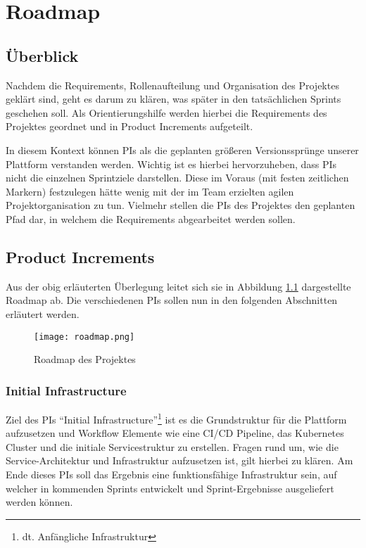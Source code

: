 
\chapter{Roadmap}

\section{Überblick}
Nachdem die Requirements, Rollenaufteilung und Organisation des Projektes geklärt sind, geht es darum zu klären, was später in den tatsächlichen Sprints geschehen soll.
Als Orientierungshilfe werden hierbei die Requirements des Projektes geordnet und in Product Increments aufgeteilt.

In diesem Kontext können \ac{PI}s als die geplanten größeren Versionssprünge unserer Plattform verstanden werden.
Wichtig ist es hierbei hervorzuheben, dass \ac{PI}s nicht die einzelnen Sprintziele darstellen.
Diese im Voraus (mit festen zeitlichen Markern) festzulegen hätte wenig mit der im Team erzielten agilen Projektorganisation zu tun.
Vielmehr stellen die \ac{PI}s des Projektes den geplanten Pfad dar, in welchem die Requirements abgearbeitet werden sollen.

\section{Product Increments}
Aus der obig erläuterten Überlegung leitet sich sie in Abbildung \ref{fig:roadmap} dargestellte Roadmap ab.
Die verschiedenen \ac{PI}s sollen nun in den folgenden Abschnitten erläutert werden.

\begin{figure}
    \centering
    \texttt{[image: roadmap.png]}
    \caption{Roadmap des Projektes}
    \label{fig:roadmap}
\end{figure}

\subsection{Initial Infrastructure}
Ziel des \ac{PI}s ``Initial Infrastructure''\footnote{dt. Anfängliche Infrastruktur} ist es die Grundstruktur für die Plattform aufzusetzen und Workflow Elemente wie eine \ac{CI/CD} Pipeline, das Kubernetes Cluster und die initiale Servicestruktur zu erstellen.
Fragen rund um, wie die Service-Architektur und Infrastruktur aufzusetzen ist, gilt hierbei zu klären.
Am Ende dieses \ac{PI}s soll das Ergebnis eine funktionsfähige Infrastruktur sein, auf welcher in kommenden Sprints entwickelt und Sprint-Ergebnisse ausgeliefert werden können.

